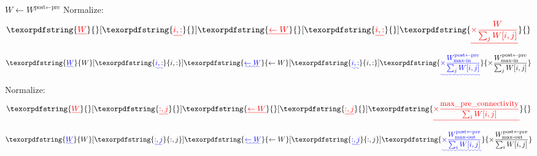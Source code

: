 \documentclass{article}
\providecommand{\DIFaddtex}[1]{{\protect\color{blue}\uwave{#1}}} %
\providecommand{\DIFdeltex}[1]{{\protect\color{red}\sout{#1}}}                      %
\providecommand{\DIFaddbegin}{} %
\providecommand{\DIFaddend}{} %
\providecommand{\DIFdelbegin}{} %
\providecommand{\DIFdelend}{} %
\providecommand{\DIFadd}[1]{\texorpdfstring{\DIFaddtex{#1}}{#1}} %
\providecommand{\DIFdel}[1]{\texorpdfstring{\DIFdeltex{#1}}{}} %
\begin{document}
\begin{algorithm}
\caption[]{Homeostasis}\label{alg:homeostasis}
\begin{algorithmic}[1]
\State $W \gets W^{\textrm{post}\leftarrow\textrm{pre}}$
        \DIFdelbegin %
\DIFdelend \DIFaddbegin {}
            \DIFaddend \State Normalize:
                \DIFdelbegin \[
                \DIFdel{W}[\DIFdel{i,:}] \DIFdel{\gets W}[\DIFdel{i,:}] 
                \DIFdel{\times
                \frac{W^\textrm{}}{\sum_j W[i,j]}
                }\]%
\DIFdelend \DIFaddbegin \[
                \DIFadd{W}[\DIFadd{i,:}] \DIFadd{\gets W}[\DIFadd{i,:}] 
                \DIFadd{\times
                \frac{W^{\textrm{post}\leftarrow\textrm{pre}}_\textrm{max-in}}{\sum_j W[i,j]}
                }\]\DIFaddend 
        \EndIf
    \EndFor
        \DIFdelbegin %
\DIFdelend \DIFaddbegin {}
            \DIFaddend \State Normalize:
                \DIFdelbegin \[
                \DIFdel{W}[\DIFdel{:,j}] \DIFdel{\gets W}[\DIFdel{:,j}] 
                \DIFdel{\times
                \frac{\text{max\_pre\_connectivity}}{\sum_i W[i,j]}
                }\]%
\DIFdelend \DIFaddbegin \[
                \DIFadd{W}[\DIFadd{:,j}] \DIFadd{\gets W}[\DIFadd{:,j}] 
                \DIFadd{\times
                \frac{W^{\textrm{post}\leftarrow\textrm{pre}}_\text{max-out}}{\sum_i W[i,j]}
                }\]\DIFaddend 
        \EndIf
    \EndFor
\EndFunction
\end{algorithmic}
\end{algorithm}
\end{document}
